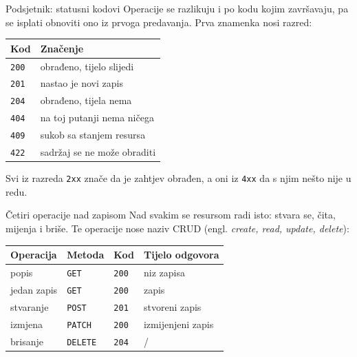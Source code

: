 \begin{frame}{Podsjetnik: statusni kodovi}
Operacije se razlikuju i po kodu kojim završavaju, pa se isplati obnoviti ono iz prvoga predavanja. Prva znamenka nosi razred:

\vspace{0.6em}
\begin{center}
{\small
\setlength{\tabcolsep}{10pt}
\renewcommand{\arraystretch}{1.25}
\begin{tabular}{@{}ll@{}}
  \toprule
  \textbf{Kod} & \textbf{Značenje} \\
  \midrule
  \texttt{200} & obrađeno, tijelo slijedi \\
  \texttt{201} & nastao je novi zapis \\
  \texttt{204} & obrađeno, tijela nema \\
  \texttt{404} & na toj putanji nema ničega \\
  \texttt{409} & sukob sa stanjem resursa \\
  \texttt{422} & sadržaj se ne može obraditi \\
  \bottomrule
\end{tabular}
}
\end{center}

\vspace{0.6em}
Svi iz razreda \texttt{2xx} znače da je zahtjev obrađen, a oni iz \texttt{4xx} da s njim nešto nije u redu.
\end{frame}

\begin{frame}{Četiri operacije nad zapisom}
Nad svakim se resursom radi isto: stvara se, čita, mijenja i briše. Te operacije nose naziv CRUD (engl. \emph{create, read, update, delete}):

\vspace{1.1em}
\begin{center}
{\small
\setlength{\tabcolsep}{10pt}
\renewcommand{\arraystretch}{1.3}
\begin{tabular}{@{}llll@{}}
  \toprule
  \textbf{Operacija} & \textbf{Metoda} & \textbf{Kod} & \textbf{Tijelo odgovora} \\
  \midrule
  popis        & \texttt{GET}    & \texttt{200} & niz zapisa \\
  jedan zapis  & \texttt{GET}    & \texttt{200} & zapis \\
  stvaranje    & \texttt{POST}   & \texttt{201} & stvoreni zapis \\
  izmjena      & \texttt{PATCH}  & \texttt{200} & izmijenjeni zapis \\
  brisanje     & \texttt{DELETE} & \texttt{204} & / \\
  \bottomrule
\end{tabular}
}
\end{center}
\end{frame}

